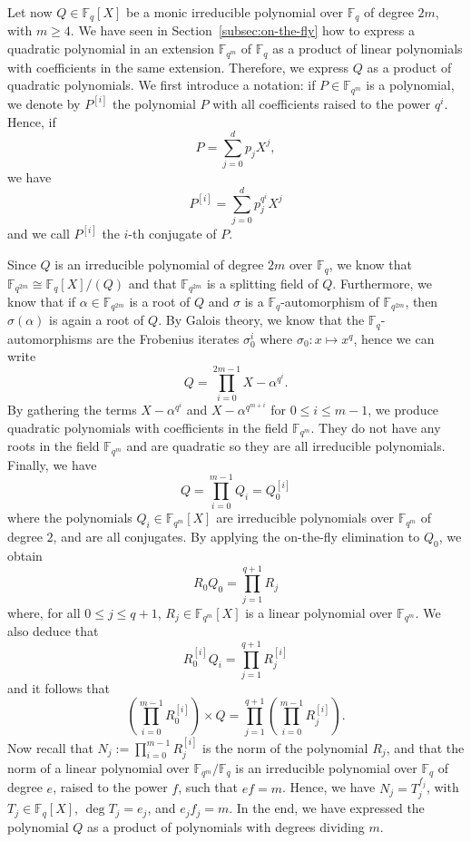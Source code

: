 \documentclass[a4paper,11pt]{article}
\theoremstyle{break}
\theoremstyle{sc}
\theoremstyle{definition}
\theoremstyle{remark}
\begin{document}
Let now $Q\in\mathbb{F}_{q}[X]$ be a monic irreducible polynomial over $\mathbb{F}_{q}$ of degree
$2m$, with $m\geq4$. We have seen in Section~\ref{subsec:on-the-fly} how to
express a quadratic polynomial in an extension $\mathbb{F}_{q^m}$ of
$\mathbb{F}_q$ as a product of linear polynomials with coefficients in the same
extension. Therefore, we express $Q$ as a product of quadratic polynomials. We
first introduce a notation: if $P\in\mathbb{F}_{q^m}$ is a polynomial, we denote
by $P^{[i]}$ the polynomial $P$ with all coefficients raised to the power $q^i$.
Hence, if
\[
  P=\sum_{j=0}^{d}p_jX^j,
\]
we have
\[
  P^{[i]}=\sum_{j=0}^dp_j^{q^i}X^j
\]
and we call $P^{[i]}$ the $i$-th conjugate of $P$.

Since $Q$ is an irreducible polynomial of degree $2m$ over $\mathbb{F}_q$, we
know that $\mathbb{F}_{q^{2m}}\cong \mathbb{F}_{q}[X]/(Q)$ and that
$\mathbb{F}_{q^{2m}}$ is a splitting field of $Q$. Furthermore, we know that if
$\alpha\in\mathbb{F}_{q^{2m}}$ is a root of $Q$ and $\sigma$ is a
$\mathbb{F}_q$-automorphism of $\mathbb{F}_{q^{2m}}$, then $\sigma(\alpha)$ is
again a root of $Q$. By Galois theory, we know that the
$\mathbb{F}_q$-automorphisms are the Frobenius iterates $\sigma_0^i$ where
$\sigma_0:x\mapsto x^q$, hence we can write 
\[
  Q = \prod_{i=0}^{2m-1}X-\alpha^{q^i}.
\]
By gathering the terms $X-\alpha^{q^i}$ and $X-\alpha^{q^{m+i}}$ for $0\leq
i\leq m-1$, we produce
quadratic polynomials with coefficients in the field $\mathbb{F}_{q^m}$. They do
not have any roots in the field $\mathbb{F}_{q^m}$ and are quadratic so they are
all irreducible polynomials.
Finally, we have
\[
  Q = \prod_{i=0}^{m-1}Q_{i}=Q_0^{[i]}
\]
where the polynomials $Q_i\in\mathbb{F}_{q^m}[X]$ are irreducible
polynomials over $\mathbb{F}_{q^m}$ of degree $2$, and are all
conjugates. By applying the on-the-fly elimination to $Q_0$, we obtain 
\[
  R_0Q_0=\prod_{j=1}^{q+1}R_j
\]
where, for all $0\leq j\leq q+1$, $R_j\in\mathbb{F}_{q^m}[X]$ is a linear
polynomial over $\mathbb{F}_{q^m}$. We also deduce that
\[
  R_{0}^{[i]}Q_i=\prod_{j=1}^{q+1}R_j^{[i]}
\]
and it follows that
\[
  (\prod_{i=0}^{m-1}R_{0}^{[i]})\times Q =
  \prod_{j=1}^{q+1}(\prod_{i=0}^{m-1}R_j^{[i]}).
\]
Now recall that $N_j:=\prod_{i=0}^{m-1}R_{j}^{[i]}$ is the norm of the
polynomial $R_j$, and that the norm of a linear polynomial over
$\mathbb{F}_{q^m}/\mathbb{F}_q$ is an irreducible polynomial over
$\mathbb{F}_q$ of degree
$e$, raised to the power $f$, such that $ef=m$. Hence, we have
$N_j=T_j^{f_j}$, with $T_j\in\mathbb{F}_{q}[X]$, $\deg T_j = e_j$, and
$e_jf_j=m$. In the end, we have expressed the polynomial $Q$ as a product of
polynomials with degrees dividing $m$.
\end{document}
